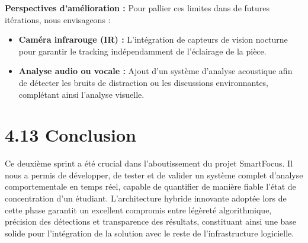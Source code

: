 \textbf{Perspectives d'amélioration :}
Pour pallier ces limites dans de futures itérations, nous envisageons :
\begin{itemize}
    \item \textbf{Caméra infrarouge (IR) :} L'intégration de capteurs de vision nocturne pour garantir le tracking indépendamment de l'éclairage de la pièce.
    \item \textbf{Analyse audio ou vocale :} Ajout d'un système d'analyse acoustique afin de détecter les bruits de distraction ou les discussions environnantes, complétant ainsi l'analyse visuelle.
\end{itemize}


\section{4.13 Conclusion}
Ce deuxième sprint a été crucial dans l'aboutissement du projet SmartFocus. Il nous a permis de développer, de tester et de valider un système complet d’analyse comportementale en temps réel, capable de quantifier de manière fiable l'état de concentration d'un étudiant. L’architecture hybride innovante adoptée lors de cette phase garantit un excellent compromis entre légèreté algorithmique, précision des détections et transparence des résultats, constituant ainsi une base solide pour l'intégration de la solution avec le reste de l'infrastructure logicielle.
